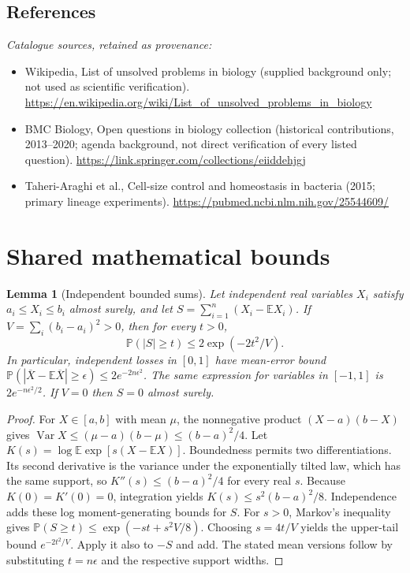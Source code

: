\documentclass[11pt]{article}
\newcommand{\E}{\mathbb E}
\newcommand{\Prob}{\mathbb P}
\DeclareMathOperator{\Var}{Var}
\providecommand{\E}{\mathbb E}
\providecommand{\Prob}{\mathbb P}
\providecommand{\Var}{\operatorname{Var}}
\newtheorem{sharedlemma}{Lemma}[section]
\begin{document}
\subsection{References}
\noindent\emph{Catalogue sources, retained as provenance:}
\begin{itemize}
\item Wikipedia, List of unsolved problems in biology (supplied background only; not used as scientific verification). \url{https://en.wikipedia.org/wiki/List_of_unsolved_problems_in_biology}
\item BMC Biology, Open questions in biology collection (historical contributions, 2013--2020; agenda background, not direct verification of every listed question). \url{https://link.springer.com/collections/eiiddehjgj}
\item Taheri-Araghi et al., Cell-size control and homeostasis in bacteria (2015; primary lineage experiments). \url{https://pubmed.ncbi.nlm.nih.gov/25544609/}
\end{itemize}
\clearpage


\appendix
\section{Shared mathematical bounds}\label{app:bounds}
\begin{sharedlemma}[Independent bounded sums]\label{lem:bounded}
Let independent real variables $X_i$ satisfy $a_i\leq X_i\leq b_i$ almost surely,
and let $S=\sum_{i=1}^n(X_i-\E X_i)$. If
$V=\sum_i(b_i-a_i)^2>0$, then for every $t>0$,
\[
 \Prob(|S|\geq t)\leq 2\exp(-2t^2/V).
\]
In particular, independent losses in $[0,1]$ have mean-error bound
$\Prob(|\overline X-\E\overline X|\geq\epsilon)
\leq2e^{-2n\epsilon^2}$. The same expression for variables in $[-1,1]$
is $2e^{-n\epsilon^2/2}$. If $V=0$ then $S=0$ almost surely.
\end{sharedlemma}
\begin{proof}
For $X\in[a,b]$ with mean $\mu$, the nonnegative product
$(X-a)(b-X)$ gives
$\Var X\leq(\mu-a)(b-\mu)\leq(b-a)^2/4$.
Let $K(s)=\log\E\exp[s(X-\E X)]$.
Boundedness permits two differentiations. Its second derivative is the variance
under the exponentially tilted law, which has the same support, so
$K''(s)\leq(b-a)^2/4$ for every real $s$.
Because $K(0)=K'(0)=0$, integration yields
$K(s)\leq s^2(b-a)^2/8$.
Independence adds these log moment-generating bounds for $S$.
For $s>0$, Markov's inequality gives
$\Prob(S\geq t)\leq\exp(-st+s^2V/8)$.
Choosing $s=4t/V$ yields the upper-tail bound $e^{-2t^2/V}$.
Apply it also to $-S$ and add. The stated mean versions follow by substituting
$t=n\epsilon$ and the respective support widths.
\end{proof}
\end{document}
